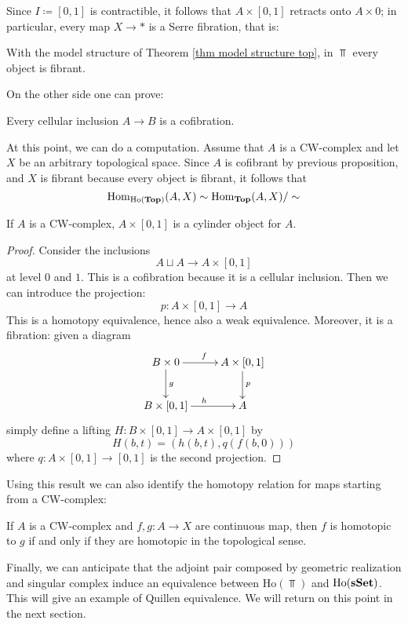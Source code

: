 \begin{refsection}
Since $I\coloneqq [0,1]$ is contractible, it follows that $A \times [0,1]$ retracts onto $A \times 0$; in particular, every map $X \to *$ is a Serre fibration, that is:

\begin{cor}
With the model structure of Theorem \ref{thm model structure top}, in $\Top$ every object is fibrant.
\end{cor}

On the other side one can prove:

\begin{lemma}
Every cellular inclusion $A \to B$ is a cofibration.
\end{lemma}

At this point, we can do a computation. Assume that $A$ is a CW-complex and let $X$ be an arbitrary topological space. Since $A$ is cofibrant by previous proposition, and $X$ is fibrant because every object is fibrant, it follows that
\[
\mathrm{Hom}_{\mathrm{Ho}(\mathbf{Top})}(A,X) \sim \mathrm{Hom}_{\mathbf{Top}}(A,X) / \sim
\]

\begin{prop}
If $A$ is a CW-complex, $A \times [0,1]$ is a cylinder object for $A$.
\end{prop}

\begin{proof}
Consider the inclusions
\[
A \sqcup A \to A \times [0,1]
\]
at level $0$ and $1$. This is a cofibration because it is a cellular inclusion. Then we can introduce the projection:
\[
p \colon A \times [0,1] \to A
\]
This is a homotopy equivalence, hence also a weak equivalence. Moreover, it is a fibration: given a diagram
\[
\xymatrix{
B \times 0 \ar[d]^g \ar[r]^f & A \times [0,1] \ar[d]^p \\ B \times [0,1] \ar[r]^h & A
}
\]
simply define a lifting $H \colon B \times [0,1] \to A \times [0,1]$ by
\[
H(b,t) = (h(b,t),q(f(b,0)))
\]
where $q \colon A \times [0,1] \to [0,1]$ is the second projection.
\end{proof}

Using this result we can also identify the homotopy relation for maps starting from a CW-complex:

\begin{prop}
If $A$ is a CW-complex and $f,g \colon A \to X$ are continuous map, then $f$ is homotopic to $g$ if and only if they are homotopic in the topological sense.
\end{prop}

Finally, we can anticipate that the adjoint pair composed by geometric realization and singular complex induce an equivalence between $\mathrm{Ho}(\Top)$ and $\mathrm{Ho}(\mathbf{sSet})$. This will give an example of Quillen equivalence. We will return on this point in the next section.


\end{refsection}
